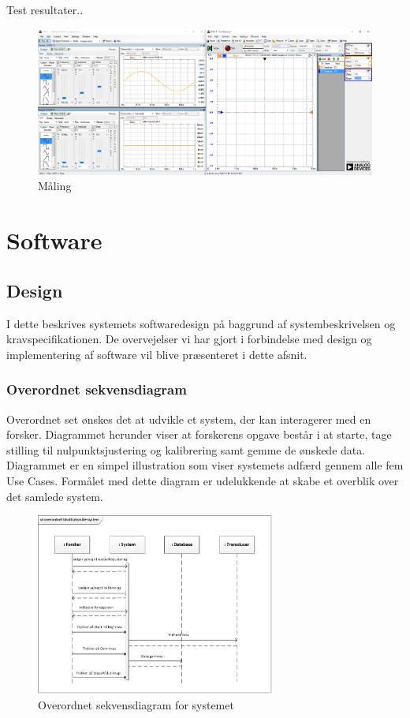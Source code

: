 Test resultater.. 
\begin{figure}[H]
	\centering	\includegraphics[width=1.0\textwidth]{Figurer/vandtest}
	\caption{Måling}
	\label{fig:vandtest_måling}
\end{figure} 


\section{Software}
\subsection{Design}
I dette beskrives systemets softwaredesign på baggrund af systembeskrivelsen og kravspecifikationen. De overvejelser vi har gjort i forbindelse med design og implementering af software vil blive præsenteret i dette afsnit. 

\subsubsection{Overordnet sekvensdiagram}
Overordnet set ønskes det at udvikle et system, der kan interagerer med en forsker. Diagrammet herunder viser at forskerens opgave består i at starte, tage stilling til nulpunktsjustering og kalibrering samt gemme de ønskede data. Diagrammet er en simpel illustration som viser systemets adfærd gennem alle fem Use Cases. Formålet med dette diagram er udelukkende at skabe et overblik over det samlede system.

\begin{figure}[H]
	\centering
	\includegraphics[width=0.7\textwidth]{Figurer/OverordnetSD}
	\caption{Overordnet sekvensdiagram for systemet}
\end{figure}

